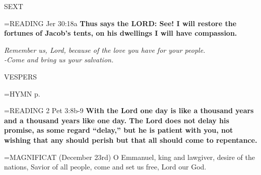 \begin{flushleft}\normalsize SEXT\\\end{flushleft}

\hangindent=\parindent \small{READING} Jer 30:18a \textbf{Thus says the LORD: See! I will restore the fortunes of Jacob’s tents, on his dwellings I will have compassion.}

\begin{center}
\textit{Remember us, Lord, because of the love you have for your people.\\
-Come and bring us your salvation.}
\end{center}

\begin{flushleft}\normalsize VESPERS\\\end{flushleft}

\hangindent=\parindent \small{\uppercase{HYMN} p.  \pageref{advent:firstHymn}\\}

\hangindent=\parindent \small{READING} 2 Pet 3:8b-9 \textbf{With the Lord one day is like a thousand years and a thousand years like one day. The Lord does not delay his promise, as some regard “delay,” but he is patient with you, not wishing that any should perish but that all should come to repentance.\\}

\hangindent=\parindent \small{MAGNIFICAT  (December 23rd) O Emmanuel, king and lawgiver, desire of the nations, Savior of all people, come and set us free, Lord our God.\\}
